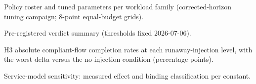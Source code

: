 \begin{table}[tbp]
\centering
\small
\caption{Policy roster and tuned parameters per workload family (corrected-horizon tuning campaign; 8-point equal-budget grids).}
\label{tab:roster}

\end{table}
\begin{table}[tbp]
\centering
\small
\caption{Pre-registered verdict summary (thresholds fixed 2026-07-06).}
\label{tab:verdict}

\end{table}
\begin{table}[tbp]
\centering
\footnotesize
\caption{H3 absolute compliant-flow completion rates at each runaway-injection level, with the worst delta versus the no-injection condition (percentage points).}
\label{tab:h3}

\end{table}
\begin{table}[tbp]
\centering
\footnotesize
\caption{Service-model sensitivity: measured effect and binding classification per constant.}
\label{tab:sens}

\end{table}

\clearpage
